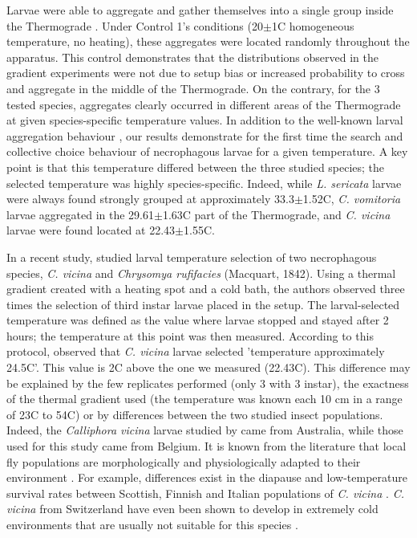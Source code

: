 Larvae were able to aggregate and gather themselves into a single group inside the Thermograde \citep{rivers_physiological_2011,boulay_evidence_2013}. Under Control 1’s conditions (20$\pm$1C homogeneous temperature, no heating), these aggregates were located randomly throughout the apparatus. This control demonstrates that the distributions observed in the gradient experiments were not due to setup bias or increased probability to cross and aggregate in the middle of the Thermograde. On the contrary, for the 3 tested species, aggregates clearly occurred in different areas of the Thermograde at given species-specific temperature values. In addition to the well-known larval aggregation behaviour \cite{boulay_evidence_2013}, our results demonstrate for the first time the search and collective choice behaviour of necrophagous larvae for a given temperature. A key point is that this temperature differed between the three studied species; the selected temperature was highly species-specific. Indeed, while \textit{L. sericata} larvae were always found strongly grouped at approximately 33.3$\pm$1.52C, \textit{C. vomitoria} larvae aggregated in the 29.61$\pm$1.63C part of the Thermograde, and \textit{C. vicina} larvae were found located at 22.43$\pm$1.55C.
        
In a recent study, \citet{johnson_tracking_2014} studied larval temperature selection of two necrophagous species, \textit{C. vicina} and \textit{Chrysomya rufifacies} (Macquart, 1842). Using a thermal gradient created with a heating spot and a cold bath, the authors observed three times the selection of third instar larvae placed in the setup. The larval-selected temperature was defined as the value where larvae stopped and stayed after 2 hours; the temperature at this point was then measured. According to this protocol, \citet{johnson_tracking_2014} observed that \textit{C. vicina} larvae selected 'temperature approximately 24.5C'. This value is 2C above the one we measured (22.43C). This difference may be explained by the few replicates performed (only 3 with 3 instar), the exactness of the thermal gradient used (the temperature was known each 10 cm in a range of 23C to 54C) or by differences between the two studied insect populations. Indeed, the \textit{Calliphora vicina} larvae studied by \citet{johnson_tracking_2014} came from Australia, while those used for this study came from Belgium. It is known from the literature that local fly populations are morphologically and physiologically adapted to their environment \citep{donovan_larval_2006,lebouvier_significance_2011,tarone_population_2011}. For example, differences exist in the diapause and low-temperature survival rates between Scottish, Finnish and Italian populations of \textit{C. vicina} \cite{saunders_effects_2013}. \textit{C. vicina} from Switzerland have even been shown to develop in extremely cold environments that are usually not suitable for this species \cite{faucherre_behavior_1999}.     


